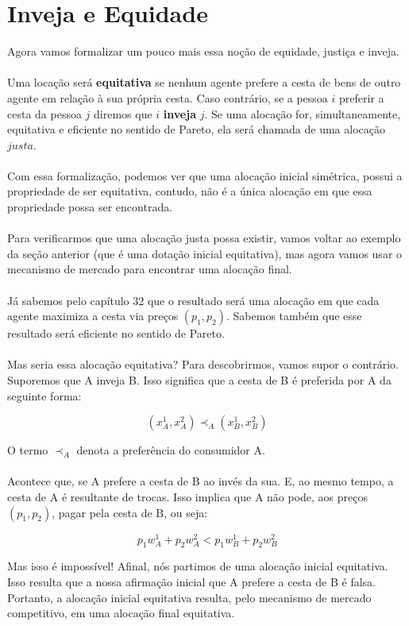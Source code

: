 \documentclass[a4paper,11pt,oneside]{book}
\theoremstyle{definition}
\theoremstyle{break}
\begin{document}
\section{Inveja e Equidade}

Agora vamos formalizar um pouco mais essa noção de equidade, justiça e inveja.
\\~\\
Uma locação será \textbf{equitativa} se nenhum agente prefere a cesta de bens de outro agente em relação à sua própria cesta. Caso contrário, se a pessoa $i$ preferir a cesta da pessoa $j$ diremos que $i$ \textbf{inveja} $j$. Se uma alocação for, simultaneamente, equitativa e eficiente no sentido de Pareto, ela será chamada de uma alocação $justa$.
\\~\\
Com essa formalização, podemos ver que uma alocação inicial simétrica, possui a propriedade de ser equitativa, contudo, não é a única alocação em que essa propriedade possa ser encontrada.
\\~\\
Para verificarmos que uma alocação justa possa existir, vamos voltar ao exemplo da seção anterior (que é uma dotação inicial equitativa), mas agora vamos usar o mecanismo de mercado para encontrar uma alocação final.
\\~\\
Já sabemos pelo capítulo 32 que o resultado será uma alocação em que cada agente maximiza a cesta via preços $(p_1,p_2)$. Sabemos também que esse resultado será eficiente no sentido de Pareto.
\\~\\
Mas seria essa alocação equitativa? Para descobrirmos, vamos supor o contrário. Suporemos que A inveja B. Isso significa que a cesta de B é preferida por A da seguinte forma:

$$ (x_A^1,x_A^2) \prec_A (x_B^1,x_B^2) $$

O termo $\prec_A$ denota a preferência do consumidor A.
\\~\\
Acontece que, se A prefere a cesta de B ao invés da sua. E, ao mesmo tempo, a cesta de A é resultante de trocas. Isso implica que A não pode, aos preços $(p_1,p_2)$, pagar pela cesta de B, ou seja:

$$ p_1w_A^1 + p_2w_A^2 < p_1w_B^1 + p_2w_B^2 $$

Mas isso é impossível! Afinal, nós partimos de uma alocação inicial equitativa. Isso resulta que a nossa afirmação inicial que A prefere a cesta de B é falsa. Portanto, a alocação inicial equitativa resulta, pelo mecanismo de mercado competitivo, em uma alocação final equitativa.
\end{document}
